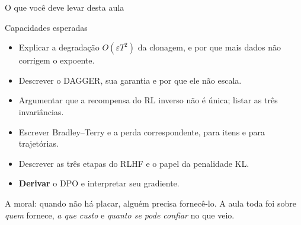 \documentclass[aspectratio=169, 11pt]{beamer}
\begin{document}
\begin{frame}{O que você deve levar desta aula}

  \begin{defbox}[fontupper=\small]{Capacidades esperadas}
    \begin{itemize}\setlength{\itemsep}{0ex}
      \item Explicar a degradação $O(\varepsilon T^2)$ da clonagem, e por que
        mais dados não corrigem o expoente.
      \item Descrever o DAGGER, sua garantia e por que ele não escala.
      \item Argumentar que a recompensa do RL inverso não é única; listar as
        três invariâncias.
      \item Escrever Bradley--Terry e a perda correspondente, para itens e para
        trajetórias.
      \item Descrever as três etapas do RLHF e o papel da penalidade KL.
      \item \textbf{Derivar} o DPO e interpretar seu gradiente.
    \end{itemize}
  \end{defbox}

  \begin{ideiabox}
    A moral: quando não há placar, alguém precisa fornecê-lo. A aula toda foi
    sobre \emph{quem} fornece, \emph{a que custo} e \emph{quanto se pode
    confiar} no que veio.
  \end{ideiabox}
\end{frame}
\end{document}
